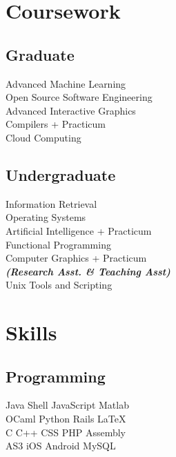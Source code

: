\documentclass[]{deedy-resume-openfont}
\begin{document}
\begin{minipage}[t]{0.33\textwidth}

\section{Coursework}
\subsection{Graduate}
Advanced Machine Learning \\
Open Source Software Engineering \\
Advanced Interactive Graphics \\
Compilers + Practicum \\
Cloud Computing \\
\sectionsep

\subsection{Undergraduate}
Information Retrieval \\
Operating Systems \\
Artificial Intelligence + Practicum \\
Functional Programming \\
Computer Graphics + Practicum \\
{\footnotesize \textit{\textbf{(Research Asst. \& Teaching Asst) }}} \\
Unix Tools and Scripting \\
\sectionsep


\section{Skills}
\subsection{Programming}
Java \textbullet{}   Shell \textbullet{} JavaScript \textbullet{} Matlab \\
OCaml \textbullet{} Python \textbullet{} Rails \textbullet{} \LaTeX\ \\
C \textbullet{} C++ \textbullet{} CSS \textbullet{} PHP \textbullet{} Assembly \\
AS3 \textbullet{} iOS \textbullet{} Android \textbullet{} MySQL
\sectionsep

%
%

\end{minipage}
\end{document}
